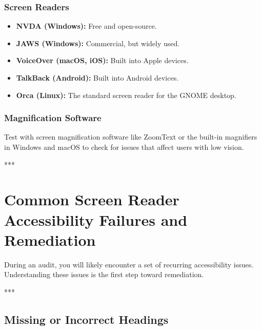 \subsubsection{Screen Readers}
\label{sub:screen-readers}
\begin{itemize}
	\item \textbf{NVDA (Windows):} Free and open-source.
	\item \textbf{JAWS (Windows):} Commercial, but widely used.
	\item \textbf{VoiceOver (macOS, iOS):} Built into Apple devices.
	\item \textbf{TalkBack (Android):} Built into Android devices.
	\item \textbf{Orca (Linux):} The standard screen reader for the GNOME desktop.
\end{itemize}

\subsubsection{Magnification Software}
\label{sub:magnification-software}
Test with screen magnification software like ZoomText or the built-in magnifiers in Windows and macOS to check for issues that affect users with low vision.

***

\section{Common Screen Reader Accessibility Failures and Remediation}
\label{sec:common-screen-reader-accessibility-failures-and-remediation}

During an audit, you will likely encounter a set of recurring accessibility issues. Understanding these issues is the first step toward remediation.

***

\subsection{Missing or Incorrect Headings}
\label{sub:missing-or-incorrect-headings}

